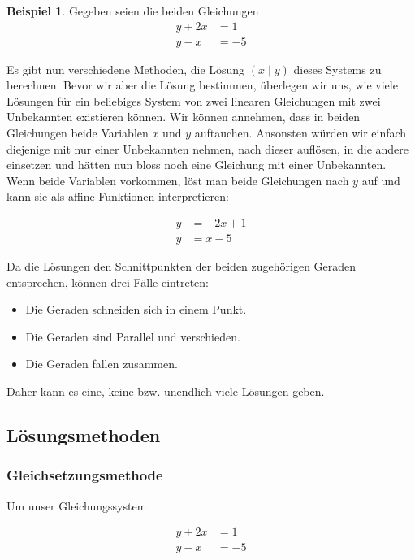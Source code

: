 \documentclass[%
11pt,%
twoside,%
titlepage,%
swissgerman,%
headsepline%
]{scrartcl}
\theoremstyle{definition}
\newtheorem{bsp}{Beispiel}[subsection] %
\theoremstyle{plain}
\begin{document}
\begin{bsp}
Gegeben seien die beiden Gleichungen
\begin{align}
y+2x&=1\\
y-x&=-5
\end{align}
\end{bsp}

Es gibt nun verschiedene Methoden, die Lösung $(x\mid y)$ dieses Systems zu berechnen. Bevor wir aber die Lösung bestimmen, überlegen wir uns, wie viele Lösungen für ein beliebiges System von zwei linearen Gleichungen mit zwei Unbekannten existieren können.
Wir können annehmen, dass in beiden Gleichungen beide Variablen $x$ und $y$ auftauchen. Ansonsten würden wir einfach diejenige mit nur einer Unbekannten nehmen, nach dieser  auflösen, in die andere einsetzen und hätten nun bloss noch eine Gleichung mit einer Unbekannten. Wenn beide Variablen vorkommen, löst man beide Gleichungen nach $y$ auf und kann sie als affine Funktionen interpretieren:

\begin{align}
y&=-2x+1\tag{$1'$}\\
y&=x-5\tag{$2'$}
\end{align}

Da die Lösungen den Schnittpunkten der beiden zugehörigen Geraden entsprechen, können drei Fälle eintreten:

\begin{itemize}
\item Die Geraden schneiden sich in einem Punkt.
\item Die Geraden sind Parallel und verschieden.
\item Die Geraden fallen zusammen.
\end{itemize}

Daher kann es eine, keine bzw. unendlich viele Lösungen geben.

\subsection{Lösungsmethoden}
\subsubsection{Gleichsetzungsmethode}

Um unser Gleichungssystem

\begin{align}
y+2x&=1\tag{1}\\
y-x&=-5\tag{2}
\end{align}
\end{document}
